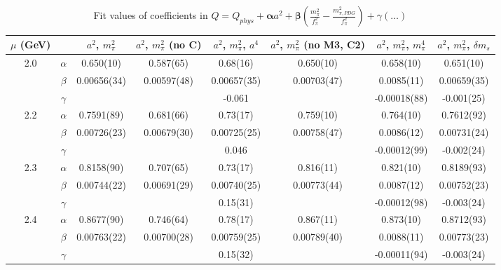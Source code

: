 \documentclass[12pt]{extarticle}
\begin{document}
\begin{table}[h!]
\begin{center}
\begin{tabular}{|c c|c|c|c|c|c|c|}
\hline
$\mu$ (GeV) &  & $a^2$, $m_\pi^2$& $a^2$, $m_\pi^2$ (no C)& $a^2$, $m_\pi^2$, $a^4$& $a^2$, $m_\pi^2$ (no M3, C2)& $a^2$, $m_\pi^2$, $m_\pi^4$& $a^2$, $m_\pi^2$, $\delta m_s$\\
\hline
\multirow{3}{0.5in}{2.0} & $\alpha$ & 0.650(10)& 0.587(65)& 0.68(16)& 0.650(10)& 0.658(10)& 0.651(10)\\
 & $\beta$ & 0.00656(34)& 0.00597(48)& 0.00657(35)& 0.00703(47)& 0.0085(11)& 0.00659(35)\\
 & $\gamma$ &  &  & -0.061&  & -0.00018(88)& -0.001(25)\\
\hline
\multirow{3}{0.5in}{2.2} & $\alpha$ & 0.7591(89)& 0.681(66)& 0.73(17)& 0.759(10)& 0.764(10)& 0.7612(92)\\
 & $\beta$ & 0.00726(23)& 0.00679(30)& 0.00725(25)& 0.00758(47)& 0.0086(12)& 0.00731(24)\\
 & $\gamma$ &  &  & 0.046&  & -0.00012(99)& -0.002(24)\\
\hline
\multirow{3}{0.5in}{2.3} & $\alpha$ & 0.8158(90)& 0.707(65)& 0.73(17)& 0.816(11)& 0.821(10)& 0.8189(93)\\
 & $\beta$ & 0.00744(22)& 0.00691(29)& 0.00740(25)& 0.00773(44)& 0.0087(12)& 0.00752(23)\\
 & $\gamma$ &  &  & 0.15(31)&  & -0.00012(98)& -0.003(24)\\
\hline
\multirow{3}{0.5in}{2.4} & $\alpha$ & 0.8677(90)& 0.746(64)& 0.78(17)& 0.867(11)& 0.873(10)& 0.8712(93)\\
 & $\beta$ & 0.00763(22)& 0.00700(28)& 0.00759(25)& 0.00789(40)& 0.0088(11)& 0.00773(23)\\
 & $\gamma$ &  &  & 0.15(32)&  & -0.00011(94)& -0.003(24)\\
\hline
\end{tabular}
\caption{Fit values of coefficients in $Q = Q_{phys} + \mathbf{\alpha} a^2 + \mathbf{\beta}\left(\frac{m_\pi^2}{f_\pi^2}-\frac{m_{\pi,PDG}^2}{f_\pi^2}\right) + \gamma(\ldots)$}
\end{center}
\end{table}







\end{document}

